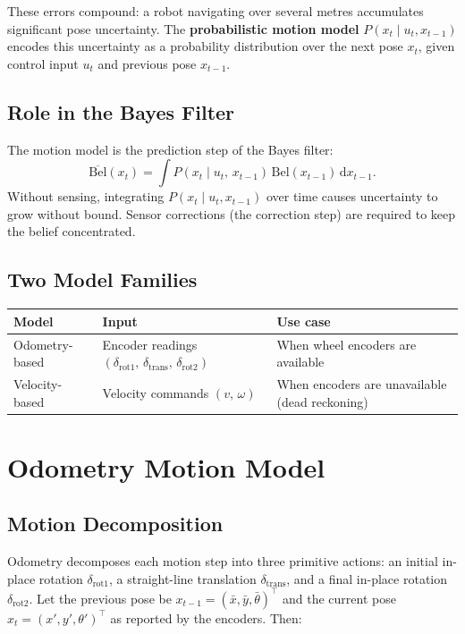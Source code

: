 \documentclass[11pt,a4paper]{article}
\theoremstyle{definition}
\theoremstyle{plain}
\theoremstyle{remark}
\begin{document}
These errors compound: a robot navigating over several metres accumulates significant pose uncertainty. The \textbf{probabilistic motion model} $P(x_t \mid u_t, x_{t-1})$ encodes this uncertainty as a probability distribution over the next pose $x_t$, given control input $u_t$ and previous pose $x_{t-1}$.

\subsection{Role in the Bayes Filter}

The motion model is the prediction step of the Bayes filter:
\[
    \overline{\mathrm{Bel}}(x_t) = \int P(x_t \mid u_t,\, x_{t-1})\,\mathrm{Bel}(x_{t-1})\,\mathrm{d}x_{t-1}.
\]
Without sensing, integrating $P(x_t \mid u_t, x_{t-1})$ over time causes uncertainty to grow without bound. Sensor corrections (the correction step) are required to keep the belief concentrated.

\subsection{Two Model Families}

\begin{center}
\begin{tabular}{lll}
\hline
\textbf{Model} & \textbf{Input} & \textbf{Use case} \\
\hline
Odometry-based & Encoder readings $(\delta_{\mathrm{rot1}},\, \delta_{\mathrm{trans}},\, \delta_{\mathrm{rot2}})$ & When wheel encoders are available \\
Velocity-based & Velocity commands $(v,\, \omega)$ & When encoders are unavailable (dead reckoning) \\
\hline
\end{tabular}
\end{center}

\section{Odometry Motion Model}

\subsection{Motion Decomposition}

Odometry decomposes each motion step into three primitive actions: an initial in-place rotation $\delta_{\mathrm{rot1}}$, a straight-line translation $\delta_{\mathrm{trans}}$, and a final in-place rotation $\delta_{\mathrm{rot2}}$. Let the previous pose be $x_{t-1} = (\bar{x}, \bar{y}, \bar{\theta})^\top$ and the current pose $x_t = (x', y', \theta')^\top$ as reported by the encoders. Then: %
\end{document}
